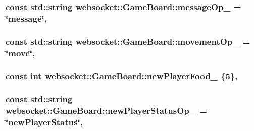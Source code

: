 \subsubsection[{\texorpdfstring{message\+Op\+\_\+}{messageOp_}}]{\setlength{\rightskip}{0pt plus 5cm}const std\+::string websocket\+::\+Game\+Board\+::message\+Op\+\_\+ = \char`\"{}message\char`\"{}\hspace{0.3cm}{\ttfamily [static]}, {\ttfamily [private]}}\hypertarget{classwebsocket_1_1GameBoard_a27fc2053eae7a0bdc4ec6cb7ff92502e}{}\label{classwebsocket_1_1GameBoard_a27fc2053eae7a0bdc4ec6cb7ff92502e}
\subsubsection[{\texorpdfstring{movement\+Op\+\_\+}{movementOp_}}]{\setlength{\rightskip}{0pt plus 5cm}const std\+::string websocket\+::\+Game\+Board\+::movement\+Op\+\_\+ = \char`\"{}move\char`\"{}\hspace{0.3cm}{\ttfamily [static]}, {\ttfamily [private]}}\hypertarget{classwebsocket_1_1GameBoard_ac5eba2bf19bde163ea767906c8e2c61c}{}\label{classwebsocket_1_1GameBoard_ac5eba2bf19bde163ea767906c8e2c61c}
\subsubsection[{\texorpdfstring{new\+Player\+Food\+\_\+}{newPlayerFood_}}]{\setlength{\rightskip}{0pt plus 5cm}const int websocket\+::\+Game\+Board\+::new\+Player\+Food\+\_\+ \{5\}\hspace{0.3cm}{\ttfamily [static]}, {\ttfamily [private]}}\hypertarget{classwebsocket_1_1GameBoard_aad2445e5c98fe42f37e71c15ca3c57c9}{}\label{classwebsocket_1_1GameBoard_aad2445e5c98fe42f37e71c15ca3c57c9}
\subsubsection[{\texorpdfstring{new\+Player\+Status\+Op\+\_\+}{newPlayerStatusOp_}}]{\setlength{\rightskip}{0pt plus 5cm}const std\+::string websocket\+::\+Game\+Board\+::new\+Player\+Status\+Op\+\_\+ = \char`\"{}new\+Player\+Status\char`\"{}\hspace{0.3cm}{\ttfamily [static]}, {\ttfamily [private]}}\hypertarget{classwebsocket_1_1GameBoard_af28eae4479ca907c062495b7ec2925c1}{}\label{classwebsocket_1_1GameBoard_af28eae4479ca907c062495b7ec2925c1}
